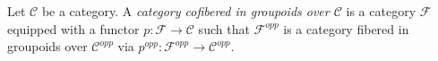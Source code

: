\begin{definition}
\label{definition-category-cofibred-groupoids}
Let $\mathcal{C}$ be a category.  A {\it category cofibered in groupoids over
$\mathcal{C}$} is a category $\mathcal{F}$ equipped with a functor
$p: \mathcal{F} \to \mathcal{C}$ such that $\mathcal{F}^{opp}$ is a category
fibered in groupoids over $\mathcal{C}^{opp}$ via
$p^{opp}: \mathcal{F}^{opp} \to \mathcal{C}^{opp}$.
\end{definition}